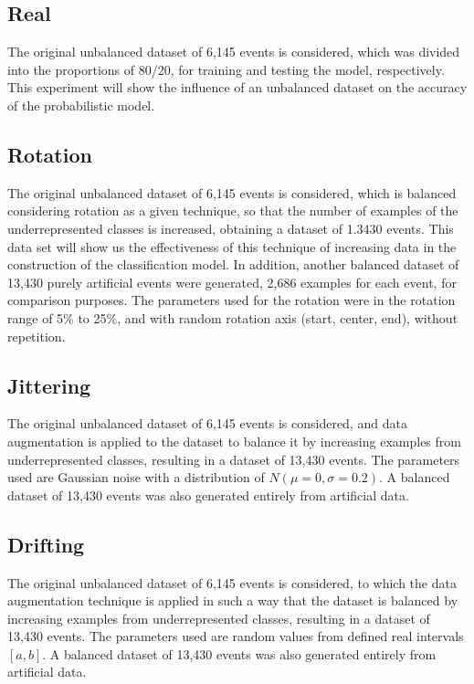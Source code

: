 \documentclass[journal]{IEEEtran}
\begin{document}
\subsection{Real}
The original unbalanced dataset of 6,145 events is considered, which was divided into the proportions of 80/20, for training and testing the model, respectively. This experiment will show the influence of an unbalanced dataset on the accuracy of the probabilistic model.
\subsection{Rotation}
The original unbalanced dataset of 6,145 events is considered, which is balanced considering rotation as a given technique, so that the number of examples of the underrepresented classes is increased, obtaining a dataset of 1.3430 events. This data set will show us the effectiveness of this technique of increasing data in the construction of the classification model.
In addition, another balanced dataset of 13,430 purely artificial events were generated, 2,686 examples for each event, for comparison purposes.
The parameters used for the rotation were in the rotation range of 5\% to 25\%, and with random rotation axis (start, center, end), without repetition.
\subsection{Jittering}
The original unbalanced dataset of 6,145 events is considered, and data augmentation is applied to the dataset to balance it by increasing examples from underrepresented classes, resulting in a dataset of 13,430 events.
The parameters used are Gaussian noise with a distribution of $N(\mu=0,\sigma=0.2)$. A balanced dataset of 13,430 events was also generated entirely from artificial data. 
\subsection{Drifting}
The original unbalanced dataset of 6,145 events is considered, to which the data augmentation technique is applied in such a way that the dataset is balanced by increasing examples from underrepresented classes, resulting in a dataset of 13,430 events.
The parameters used are random values from defined real intervals $[a,b]$. A balanced dataset of 13,430 events was also generated entirely from artificial data.
\end{document}
